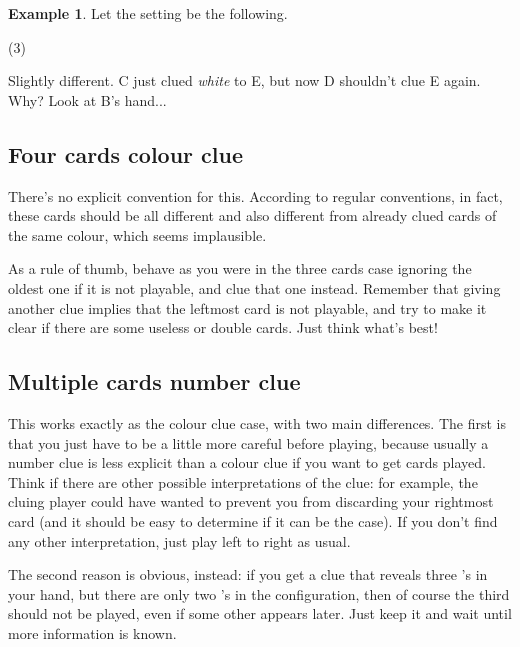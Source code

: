\documentclass[a4paper]{article}
\theoremstyle{plain}
\theoremstyle{definition}
\newtheorem{example}[theorem]{Example}
\begin{document}
\begin{example}
	
	Let the setting be the following.
	
	\begin{tasks}(3)
		\task[+]      
		\task[A]    
		\task[B]    
		\task[C]    
		\task[D]    
		\task[E]    
	\end{tasks}
	
	Slightly different. C just clued \textit{white} to E, but now D shouldn't clue E again. Why? Look at B's hand...
	
\end{example}

\subsection{Four cards colour clue}

There's no explicit convention for this. According to regular conventions, in fact, these cards should be all different and also different from already clued cards of the same colour, which seems implausible.

As a rule of thumb, behave as you were in the three cards case ignoring the oldest one if it is not playable, and clue that one instead. Remember that giving another clue implies that the leftmost card is not playable, and try to make it clear if there are some useless or double cards. Just think what's best!

\subsection{Multiple cards number clue}

This works exactly as the colour clue case, with two main differences. The first is that you just have to be a little more careful before playing, because usually a number clue is less explicit than a colour clue if you want to get cards played. Think if there are other possible interpretations of the clue: for example, the cluing player could have wanted to prevent you from discarding your rightmost card (and it should be easy to determine if it can be the case). If you don't find any other interpretation, just play left to right as usual.

The second reason is obvious, instead: if you get a clue that reveals three 's in your hand, but there are only two 's in the configuration, then of course the third  should not be played, even if some other  appears later. Just keep it and wait until more information is known.
\end{document}

